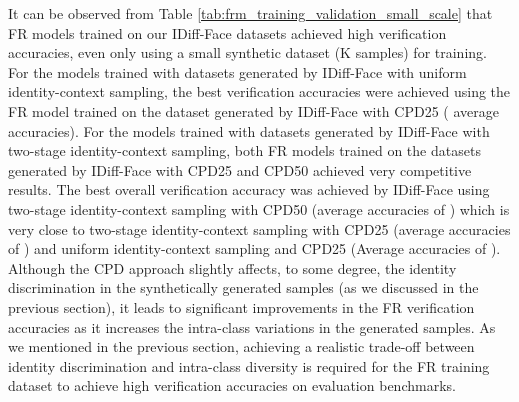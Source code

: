 \documentclass[10pt,twocolumn,letterpaper]{article}
\newcommand{\approachname}{IDiff-Face }
\begin{document}
It can be observed from Table \ref{tab:frm_training_validation_small_scale} that FR models trained on our \approachname datasets achieved high verification accuracies, even only using a small synthetic dataset (K samples) for training.
For the models trained with datasets generated by \approachname with uniform identity-context sampling, the best verification accuracies were achieved using the FR model trained on the dataset generated by \approachname with CPD25 ( average accuracies). For the models trained with datasets generated by \approachname with two-stage identity-context sampling, both FR models trained on  the datasets generated by \approachname with CPD25 and CPD50 achieved very competitive results. The best overall verification accuracy was achieved by \approachname using two-stage identity-context sampling with CPD50 (average accuracies of ) which is very close to two-stage identity-context sampling with CPD25 (average accuracies of ) and uniform identity-context sampling and CPD25 (Average accuracies of ). 
Although the CPD approach slightly affects, to some degree, the identity discrimination in the synthetically generated samples (as we discussed in the previous section), it leads to significant improvements in the FR verification accuracies as it increases the intra-class variations in the generated samples. As we mentioned in the previous section, achieving a realistic trade-off between identity discrimination and intra-class diversity is required for the FR training dataset to achieve high verification accuracies on evaluation benchmarks.
\end{document}
